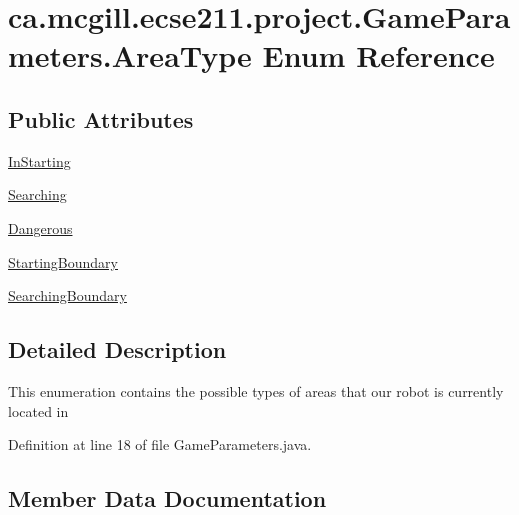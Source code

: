 \hypertarget{enumca_1_1mcgill_1_1ecse211_1_1project_1_1_game_parameters_1_1_area_type}{}\section{ca.\+mcgill.\+ecse211.\+project.\+Game\+Parameters.\+Area\+Type Enum Reference}
\label{enumca_1_1mcgill_1_1ecse211_1_1project_1_1_game_parameters_1_1_area_type}
\subsection*{Public Attributes}
\begin{DoxyCompactItemize}
\item 
\hyperlink{enumca_1_1mcgill_1_1ecse211_1_1project_1_1_game_parameters_1_1_area_type_a90e9cb33114c7af62aa86684942265e5}{In\+Starting}
\item 
\hyperlink{enumca_1_1mcgill_1_1ecse211_1_1project_1_1_game_parameters_1_1_area_type_a25564076fdd8880377fbd6eaf753456f}{Searching}
\item 
\hyperlink{enumca_1_1mcgill_1_1ecse211_1_1project_1_1_game_parameters_1_1_area_type_ac762256f8b33e7c93c162520a0349769}{Dangerous}
\item 
\hyperlink{enumca_1_1mcgill_1_1ecse211_1_1project_1_1_game_parameters_1_1_area_type_afd78c1184c6b82e22bb08ed39ae4e83b}{Starting\+Boundary}
\item 
\hyperlink{enumca_1_1mcgill_1_1ecse211_1_1project_1_1_game_parameters_1_1_area_type_a5a3aceb665ba97ac242e77955feed640}{Searching\+Boundary}
\end{DoxyCompactItemize}


\subsection{Detailed Description}
This enumeration contains the possible types of areas that our robot is currently located in 

Definition at line 18 of file Game\+Parameters.\+java.



\subsection{Member Data Documentation}
\mbox{\label{enumca_1_1mcgill_1_1ecse211_1_1project_1_1_game_parameters_1_1_area_type_ac762256f8b33e7c93c162520a0349769}} 
